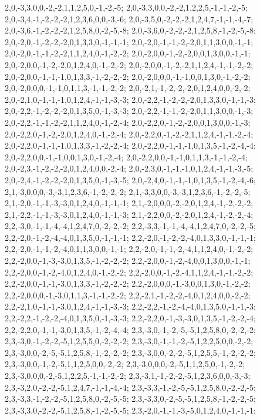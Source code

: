 {{2,0,-3,3,0,0,-2,-2,1,1,2,5,0,-1,-2,-5; 2,0,-3,3,0,0,-2,-2,1,2,2,5,-1,-1,-2,-5; 2,0,-3,4,-1,-2,-2,-2,1,2,3,6,0,0,-3,-6; 2,0,-3,5,0,-2,-2,-2,1,2,4,7,-1,-1,-4,-7; 2,0,-3,6,-1,-2,-2,-2,1,2,5,8,0,-2,-5,-8; 2,0,-3,6,0,-2,-2,-2,1,2,5,8,-1,-2,-5,-8; 2,0,-2,0,-1,-2,-2,-2,0,1,3,3,0,-1,-1,-1; 2,0,-2,0,-1,-1,-2,-2,0,1,1,3,0,0,-1,-1; 2,0,-2,0,-1,-1,-2,-2,1,1,2,4,0,-1,-2,-2; 2,0,-2,0,0,-1,-2,-2,0,0,1,3,0,0,-1,-1; 2,0,-2,0,0,-1,-2,-2,0,1,2,4,0,-1,-2,-2; 2,0,-2,0,0,-1,-2,-2,1,1,2,4,-1,-1,-2,-2;
2,0,-2,0,0,-1,-1,-1,0,1,3,3,-1,-2,-2,-2; 2,0,-2,0,0,0,-1,-1,0,0,1,3,0,-1,-2,-2; 2,0,-2,0,0,0,-1,-1,0,1,1,3,-1,-1,-2,-2; 2,0,-2,1,-1,-2,-2,-2,0,1,2,4,0,0,-2,-2; 2,0,-2,1,0,-1,-1,-1,0,1,2,4,-1,-1,-3,-3; 2,0,-2,2,-1,-2,-2,-2,0,1,3,3,0,-1,-1,-3; 2,0,-2,2,-1,-2,-2,-2,0,1,3,5,0,-1,-3,-3; 2,0,-2,2,-1,-1,-2,-2,0,1,1,3,0,0,-1,-3; 2,0,-2,2,-1,-1,-2,-2,1,1,2,4,0,-1,-2,-4; 2,0,-2,2,0,-1,-2,-2,0,0,1,3,0,0,-1,-3; 2,0,-2,2,0,-1,-2,-2,0,1,2,4,0,-1,-2,-4; 2,0,-2,2,0,-1,-2,-2,1,1,2,4,-1,-1,-2,-4;
2,0,-2,2,0,-1,-1,-1,0,1,3,3,-1,-2,-2,-4; 2,0,-2,2,0,-1,-1,-1,0,1,3,5,-1,-2,-4,-4; 2,0,-2,2,0,0,-1,-1,0,0,1,3,0,-1,-2,-4; 2,0,-2,2,0,0,-1,-1,0,1,1,3,-1,-1,-2,-4; 2,0,-2,3,-1,-2,-2,-2,0,1,2,4,0,0,-2,-4; 2,0,-2,3,0,-1,-1,-1,0,1,2,4,-1,-1,-3,-5; 2,0,-2,4,-1,-2,-2,-2,0,1,3,5,0,-1,-3,-5; 2,0,-2,4,0,-1,-1,-1,0,1,3,5,-1,-2,-4,-6; 2,1,-3,0,0,0,-3,-3,1,2,3,6,-1,-2,-2,-2; 2,1,-3,3,0,0,-3,-3,1,2,3,6,-1,-2,-2,-5; 2,1,-2,0,-1,-1,-3,-3,0,1,2,4,0,-1,-1,-1; 2,1,-2,0,0,0,-2,-2,0,1,2,4,-1,-2,-2,-2;
2,1,-2,2,-1,-1,-3,-3,0,1,2,4,0,-1,-1,-3; 2,1,-2,2,0,0,-2,-2,0,1,2,4,-1,-2,-2,-4; 2,2,-3,0,-1,-1,-4,-4,1,2,4,7,0,-2,-2,-2; 2,2,-3,3,-1,-1,-4,-4,1,2,4,7,0,-2,-2,-5; 2,2,-2,0,-1,-2,-4,-4,0,1,3,5,0,-1,-1,-1; 2,2,-2,0,-1,-2,-2,-4,0,1,3,3,0,-1,-1,-1; 2,2,-2,0,-1,-1,-2,-4,0,1,1,3,0,0,-1,-1; 2,2,-2,0,-1,-1,-2,-4,1,1,2,4,0,-1,-2,-2; 2,2,-2,0,0,-1,-3,-3,0,1,3,5,-1,-2,-2,-2; 2,2,-2,0,0,-1,-2,-4,0,0,1,3,0,0,-1,-1; 2,2,-2,0,0,-1,-2,-4,0,1,2,4,0,-1,-2,-2; 2,2,-2,0,0,-1,-2,-4,1,1,2,4,-1,-1,-2,-2;
2,2,-2,0,0,-1,-1,-3,0,1,3,3,-1,-2,-2,-2; 2,2,-2,0,0,0,-1,-3,0,0,1,3,0,-1,-2,-2; 2,2,-2,0,0,0,-1,-3,0,1,1,3,-1,-1,-2,-2; 2,2,-2,1,-1,-2,-2,-4,0,1,2,4,0,0,-2,-2; 2,2,-2,1,0,-1,-1,-3,0,1,2,4,-1,-1,-3,-3; 2,2,-2,2,-1,-2,-4,-4,0,1,3,5,0,-1,-1,-3; 2,2,-2,2,-1,-2,-2,-4,0,1,3,5,0,-1,-3,-3; 2,2,-2,2,0,-1,-3,-3,0,1,3,5,-1,-2,-2,-4; 2,2,-2,2,0,-1,-1,-3,0,1,3,5,-1,-2,-4,-4; 2,3,-3,0,-1,-2,-5,-5,1,2,5,8,0,-2,-2,-2; 2,3,-3,0,-1,-2,-2,-5,1,2,5,5,0,-2,-2,-2; 2,3,-3,0,-1,-1,-2,-5,1,2,2,5,0,0,-2,-2;
2,3,-3,0,0,-2,-5,-5,1,2,5,8,-1,-2,-2,-2; 2,3,-3,0,0,-2,-2,-5,1,2,5,5,-1,-2,-2,-2; 2,3,-3,0,0,-1,-2,-5,1,1,2,5,0,0,-2,-2; 2,3,-3,0,0,0,-2,-5,1,1,2,5,0,-1,-2,-2; 2,3,-3,0,0,0,-2,-5,1,2,2,5,-1,-1,-2,-2; 2,3,-3,1,-1,-2,-2,-5,1,2,3,6,0,0,-3,-3; 2,3,-3,2,0,-2,-2,-5,1,2,4,7,-1,-1,-4,-4; 2,3,-3,3,-1,-2,-5,-5,1,2,5,8,0,-2,-2,-5; 2,3,-3,3,-1,-2,-2,-5,1,2,5,8,0,-2,-5,-5; 2,3,-3,3,0,-2,-5,-5,1,2,5,8,-1,-2,-2,-5; 2,3,-3,3,0,-2,-2,-5,1,2,5,8,-1,-2,-5,-5; 2,3,-2,0,-1,-1,-3,-5,0,1,2,4,0,-1,-1,-1;
}}
